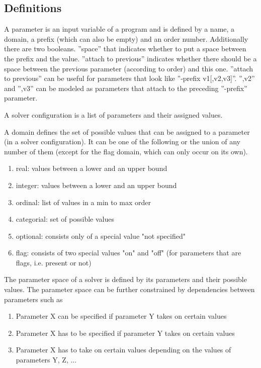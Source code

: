 \subsection{Definitions}
A parameter is an input variable of a program and is defined by a name, a domain, a prefix (which can also be empty) and an order number.
Additionally there are two booleans. ''space'' that indicates whether to put a space between the prefix and the value. ''attach to previous''
indicates whether there should be a space between the previous parameter (according to order) and this one.
''attach to previous'' can be useful for parameters that look like ''-prefix v1[,v2,v3]''. '',v2'' and '',v3'' can be modeled as parameters that attach
to the preceding ''-prefix'' parameter.

\begin{definition}
A solver configuration is a list of parameters and their assigned values.
\end{definition}

\begin{definition}
A domain defines the set of possible values that can be assigned to a parameter (in a solver configuration). It can be one of the following or the union of any number of them (except for the flag domain, which can only occur on its own).
\begin{enumerate}
\item real: values between a lower and an upper bound
\item integer: values between a lower and an upper bound
\item ordinal: list of values in a min to max order
\item categorial: set of possible values
\item optional: consists only of a special value "not specified"
\item flag: consists of two special values "on" and "off" (for parameters that are flags, i.e. present or not)
\end{enumerate}
\end{definition}

\begin{definition}
The parameter space of a solver is defined by its parameters and their possible values. The parameter space can be further constrained by
dependencies between parameters such as
\begin{enumerate}
\item Parameter X can be specified if parameter Y takes on certain values
\item Parameter X has to be specified if parameter Y takes on certain values
\item Parameter X has to take on certain values depending on the values of parameters Y, Z, ...
\end{enumerate}
\end{definition}

